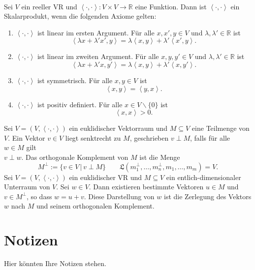 \documentclass[a4paper,12pt]{article}
\begin{document}
\hfill\\
Sei $V$ ein reeller VR und $\left\langle \cdot ,\cdot \right\rangle :V\times V\rightarrow \mathbb{R}$ eine Funktion. Dann ist $\left\langle \cdot ,\cdot \right\rangle $ ein Skalarprodukt, wenn die folgenden Axiome gelten:
\begin{enumerate}[label=(\alph*)]
        \item $\left\langle \cdot ,\cdot \right\rangle $ ist linear im ersten Argument. Für alle $x,x',y \in V$ und $\lambda ,\lambda ' \in \mathbb{R}$ ist
                \[ 
                        \left\langle \lambda x+\lambda 'x',y\right\rangle =\lambda \left\langle x,y\right\rangle +\lambda '\left\langle x',y\right\rangle 
                .\] 
        \item $\left\langle \cdot ,\cdot \right\rangle $ ist linear im zweiten Argument. Für alle $x,y,y' \in V$ und $\lambda ,\lambda ' \in \mathbb{R}$ ist
                \[ 
                        \left\langle \lambda x+\lambda 'x,y'\right\rangle =\lambda \left\langle x,y\right\rangle +\lambda '\left\langle x,y'\right\rangle 
                .\] 
        \item $\left\langle \cdot ,\cdot \right\rangle $ ist symmetrisch. Für alle $x,y \in V$ ist
                \[ 
                        \left\langle x,y\right\rangle =\left\langle y,x\right\rangle 
                .\] 
        \item $\left\langle \cdot ,\cdot \right\rangle $ ist positiv definiert. Für alle $x \in V\backslash \{0\}$ ist
                \[ 
                        \left\langle x,x\right\rangle >0
                .\] 
\end{enumerate}
Sei $V=\left(V,\left\langle \cdot ,\cdot \right\rangle \right)$ ein euklidischer Vektorraum und $M\subseteq V$ eine Teilmenge von $V$. Ein Vektor $v \in V$ liegt senktrecht zu $M$, geschrieben $v\perp M$, falls für alle $w \in M$ gilt\\
$v\perp w$. Das orthogonale Komplement von $M$ ist die Menge
\[ 
        M^{\perp}:=\{v \in V\,|\, v\perp M\}\qquad \mathfrak{L}\left(m^\perp_1,\hdots ,m^\perp_n,m_1,\hdots ,m_m\right)=V
.\] 
Sei $V=\left(V,\left\langle \cdot ,\cdot \right\rangle \right)$ ein euklidischer VR und $M\subseteq V$ ein entlich-dimensionaler Unterraum von $V$. Sei $w \in V$. Dann existieren bestimmte Vektoren $u \in M$ und $v \in M^\perp$, so dass $w=u+v$. Diese Darstellung von $w$ ist die Zerlegung des Vektors $w$ nach $M$ und seinem orthogonalen Komplement.

 

\newpage

\section{Notizen}
Hier könnten Ihre Notizen stehen.

\end{document}
